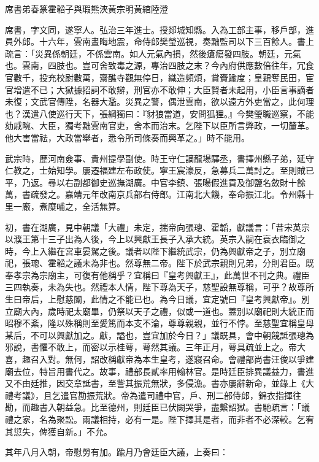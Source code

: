 
\begin{pinyinscope}
席書弟春篆霍韜子與瑕熊浹黃宗明黃綰陸澄

席書，字文同，遂寧人。弘治三年進士。授郯城知縣。入為工部主事，移戶部，進員外郎。十六年，雲南晝晦地震，命侍郎樊瑩巡視，奏黜監司以下三百餘人。書上疏言：「災異係朝廷，不係雲南。如人元氣內損，然後瘡瘍發四肢。朝廷，元氣也。雲南，四肢也。豈可舍致毒之源，專治四肢之末？今內府供應數倍往年，冗食官數千，投充校尉數萬，齋醮寺觀無停日，織造頻煩，賞賚踰度；皇親奪民田，宦官增遣不已；大獄據招詞不敢辯，刑官亦不敢伸；大臣賢者未起用，小臣言事謫者未復；文武官傳陞，名器大濫。災異之警，偶泄雲南，欲以遠方外吏當之，此何理也？漢遣八使巡行天下，張綱獨曰：『豺狼當道，安問狐狸。』今樊瑩職巡察，不能劾戚畹、大臣，獨考黜雲南官吏，舍本而治末。乞陛下以臣所言弊政，一切釐革。他大害當祛，大政當舉者，悉令所司條奏而興革之。」時不能用。

武宗時，歷河南僉事、貴州提學副使。時王守仁謫龍場驛丞，書擇州縣子弟，延守仁教之，士始知學。屢遷福建左布政使。寧王宸濠反，急募兵二萬討之。至則賊已平，乃返。尋以右副都御史巡撫湖廣。中官李鎮、張暘假進貢及御鹽名斂財十餘萬，書疏發之。嘉靖元年改南京兵部右侍郎。江南北大饑，奉命振江北。令州縣十里一廠，煮糜哺之，全活無算。

初，書在湖廣，見中朝議「大禮」未定，揣帝向張璁、霍韜，獻議言：「昔宋英宗以濮王第十三子出為人後，今上以興獻王長子入承大統。英宗入嗣在袞衣臨御之時，今上入繼在宮車晏駕之後。議者以陛下繼統武宗，仍為興獻帝之子，別立廟祀，張璁、霍韜之議未為非也。然尊無二帝。陛下於武宗親則兄弟，分則君臣。既奉孝宗為宗廟主，可復有他稱乎？宜稱曰『皇考興獻王』，此萬世不刊之典。禮臣三四執奏，未為失也。然禮本人情，陛下尊為天子，慈聖設無尊稱，可乎？故尊所生曰帝后，上慰慈闈，此情之不能已也。為今日議，宜定號曰『皇考興獻帝』。別立廟大內，歲時祀太廟畢，仍祭以天子之禮，似或一道也。蓋別以廟祀則大統正而昭穆不紊，隆以殊稱則至愛篤而本支不淪，尊尊親親，並行不悖。至慈聖宜稱皇母某后，不可以興獻加之。獻，謚也，豈宜加於今日？」議既具，會中朝競詆張璁為邪說，書懼不敢上，而密以示桂萼，萼然其議。三年正月，萼具疏並上之。帝大喜，趣召入對。無何，詔改稱獻帝為本生皇考，遂寢召命。會禮部尚書汪俊以爭建廟去位，特旨用書代之。故事，禮部長貳率用翰林官。是時廷臣排異議益力，書進又不由廷推，因交章詆書，至訾其振荒無狀，多侵漁。書亦屢辭新命，並錄上《大禮考議》，且乞遣官勘振荒狀。帝為遣司禮中官，戶、刑二部侍郎，錦衣指揮往勘，而趣書入朝益急。比至德州，則廷臣已伏闕哭爭，盡繫詔獄。書馳疏言：「議禮之家，名為聚訟。兩議相持，必有一是。陛下擇其是者，而非者不必深較。乞宥其愆失，俾獲自新。」不允。

其年八月入朝，帝慰勞有加。踰月乃會廷臣大議，上奏曰：


\end{pinyinscope}
